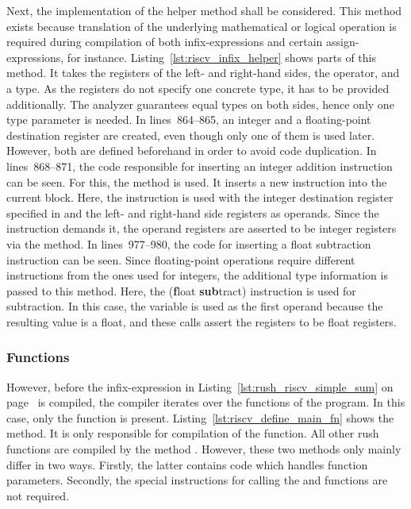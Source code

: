 Next, the implementation of the  helper method shall be considered.
This method exists because translation of the underlying mathematical or logical operation
is required during compilation of both infix-expressions and certain assign-expressions, \mbox{} for instance.
Listing~\ref{lst:riscv_infix_helper} shows parts of this method.
It takes the registers of the left- and right-hand sides, the operator, and a type.
As the registers do not specify one concrete type, it has to be provided additionally.
The analyzer guarantees equal types on both sides, hence only one type parameter is needed.
In lines~864--865, an integer and a floating-point destination register are created, even though only one of them is used later.
However, both are defined beforehand in order to avoid code duplication.
In lines~868--871, the code responsible for inserting an integer addition instruction can be seen.
For this, the  method is used.
It inserts a new instruction into the current block.
Here, the  instruction is used with the integer destination register specified in  and the left- and right-hand side registers as operands.
Since the  instruction demands it, the operand registers are asserted to be integer registers via the  method.
In lines~977--980, the code for inserting a float subtraction instruction can be seen.
Since floating-point operations require different instructions from the ones used for integers, the additional type information is passed to this method.
Here, the  (\textbf{f}loat \textbf{sub}tract) instruction is used for subtraction.
In this case, the variable  is used as the first operand because the resulting value is a float,
and these  calls assert the registers to be float registers.

\subsubsection{Functions}

However, before the infix-expression in Listing~\ref{lst:rush_riscv_simple_sum} on page~\pageref{lst:rush_riscv_simple_sum} is compiled, the compiler iterates over the functions of the program.
In this case, only the  function is present.
Listing~\ref{lst:riscv_define_main_fn} shows the  method.
It is only responsible for compilation of the  function.
All other rush functions are compiled by the method .
However, these two methods only mainly differ in two ways.
Firstly, the latter contains code which handles function parameters.
Secondly, the special instructions for calling the  and  functions are not required.

